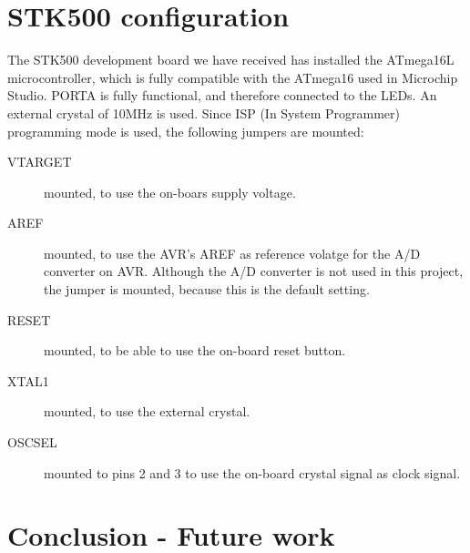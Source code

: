 \documentclass[12pt, a4, hidelinks]{article}
\begin{document}
\section*{STK500 configuration}
The STK500 development board we have received has installed the ATmega16L microcontroller, which is fully compatible with the ATmega16 used in Microchip Studio. PORTA is fully functional, and therefore connected to the LEDs. An external crystal of 10MHz is used. Since ISP (In System Programmer) programming mode is used, the following jumpers are mounted:
\begin{description}
\item[VTARGET] mounted, to use the on-boars supply voltage.
\item[AREF] mounted, to use the AVR's AREF as reference volatge for the A/D converter on AVR. Although the A/D converter is not used in this project, the jumper is mounted, because this is the default setting.
\item[RESET] mounted, to be able to use the on-board reset button.
\item[XTAL1] mounted, to use the external crystal.
\item[OSCSEL] mounted to pins 2 and 3 to use the on-board crystal signal as clock signal.
\end{description}

\section*{Conclusion - Future work}
\end{document}
